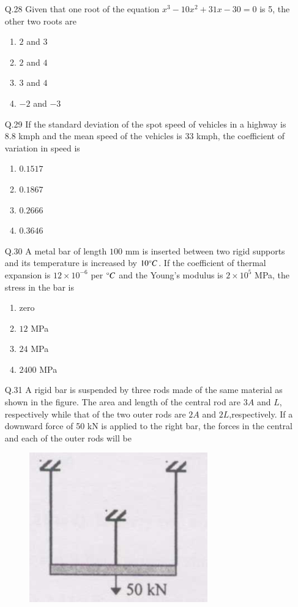 \documentclass[journal,12pt,onecolumn]{IEEEtran}
\theoremstyle{remark}
\begin{document}
\begin{enumerate}
\begin{enumerate}
		\end{enumerate}
	\item[Q.28]Given that one root of the equation $x^3-10x^2+31x-30=0$ is 5, the other two roots are
\begin{enumerate}
                \item $2$ and $3$
                \item $2$ and $4$
                \item $3$ and $4$
                \item $-2$ and $-3$
        \end{enumerate}
\item[Q.29] If the standard deviation of the spot speed of vehicles in a highway is 8.8 kmph and the mean speed of the vehicles is 33 kmph, the coefficient of variation in speed is 
	\begin{enumerate}
                \item $0.1517$
                \item $0.1867$
                \item $0.2666$
                \item $0.3646$
        \end{enumerate}
\item[Q.30] A metal bar of length $100$ mm is inserted between two rigid supports and its temperature is increased by $10{\degree}C$. If the coefficient of thermal expansion is $12 \times 10^{-6}$ per ${\degree}C$ and the Young's modulus is $2 \times 10^5$ MPa, the stress in the bar is 
	\begin{enumerate}
                \item zero
                \item $12$ MPa
                \item $24$ MPa
                \item $2400$ MPa
        \end{enumerate}
\item[Q.31] A rigid bar is suspended by three rods made of the same material as shown in the figure. The area and length of the central rod are $3A$ and $L$, respectively while that of the two outer rods are $2A$ and $2L$,respectively. If a downward force of 50 kN is applied to the right bar, the forces in the central and each of the outer rods will be
\begin{figure}[h!]
        \centering
	\includegraphics[width=0.2\linewidth]{fig/Fig.png}

\end{figure}
\end{enumerate}
\end{document}

